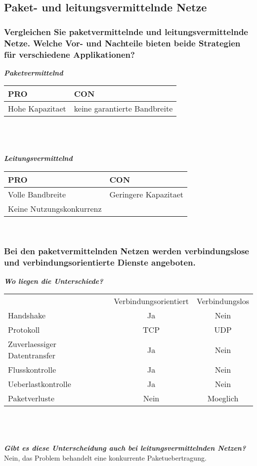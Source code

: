 \documentclass{article}
\newcommand{\gap}{\\ \ \\}
\newcommand{\headline}[1]{\textbf{\textit{#1}}\\}
\begin{document}
\subsection{Paket- und leitungsvermittelnde Netze}

\subsubsection{
    Vergleichen Sie paketvermittelnde und leitungsvermittelnde Netze.
    Welche Vor- und Nachteile bieten beide Strategien für 
    verschiedene Applikationen?
}
\headline{Paketvermittelnd}
\begin{tabular}{l|l}
    PRO & CON\\
    \hline
    Hohe Kapazitaet&
        keine garantierte Bandbreite\\
\end{tabular}\\
\gap
\headline{Leitungsvermittelnd}
\begin{tabular}{l|l}
    PRO & CON\\
    \hline
    Volle Bandbreite&
        Geringere Kapazitaet\\
    Keine Nutzungskonkurrenz&
        \\
\end{tabular}\\

\subsubsection{
    Bei den paketvermittelnden Netzen werden verbindungslose und 
    verbindungsorientierte Dienste angeboten.
}
\headline{Wo liegen die Unterschiede?}
\begin{tabular}{l|c|c}
        &Verbindungsorientiert&Verbindungslos\\
    Handshake&
        Ja&Nein\\
    \hline
    Protokoll&
        TCP&UDP\\
    Zuverlaessiger Datentransfer&
        Ja&Nein\\
    Flusskontrolle&
        Ja&Nein\\
    Ueberlastkontrolle&
        Ja&Nein\\
    \hline
    Paketverluste&
        Nein&Moeglich\\
\end{tabular}\\
\gap
\headline{Gibt es diese Unterscheidung auch bei leitungsvermittelnden Netzen?} 
Nein, das Problem behandelt eine konkurrente Paketuebertragung.\\
\end{document}

